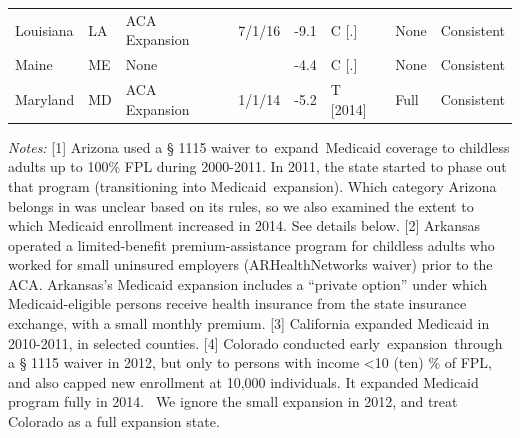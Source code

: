 \documentclass[12pt]{article}%
\begin{document}
\begin{appendices}
\begin{table}[]
\begin{adjustbox}{width=.99\textwidth}
\begin{tabular}{@{}llllllll@{}}
Louisiana                                    & LA                          & ACA Expansion                                                                                               & 7/1/16                   & -9.1                                                                                     & C {[}.{]}                     & None                         & Consistent                                                                                 \\ \addlinespace
Maine                                        & ME                          & None                                                                                                        &                          & -4.4                                                                                       & C {[}.{]}                     & None                         & Consistent                                                                                 \\ \addlinespace
Maryland                                     & MD                          & ACA Expansion                                                                                               & 1/1/14                   & -5.2                                                                                     & T {[}2014{]}                  & Full                         & Consistent                                                                                 \\ \bottomrule
\end{tabular}
\end{adjustbox}
\begin{scriptsize}
 \begin{justify}
   \textit{Notes:} [1] Arizona used a § 1115 waiver to expand Medicaid coverage to childless adults up to 100\% FPL during 2000-2011. In 2011, the state started to phase out that program (transitioning into Medicaid expansion).  Which category Arizona belongs in was unclear based on its rules, so we also examined the extent to which Medicaid enrollment increased in 2014.  See details below.
[2] Arkansas operated a limited-benefit premium-assistance program for childless adults who worked for small uninsured employers (ARHealthNetworks waiver) prior to the ACA.  Arkansas’s Medicaid expansion includes a “private option” under which Medicaid-eligible persons receive health insurance from the state insurance exchange, with a small monthly premium.
[3] California expanded Medicaid in 2010-2011, in selected counties.
[4] Colorado conducted early expansion through a § 1115 waiver in 2012, but only to persons with income <10 (ten) \% of FPL, and also capped new enrollment at 10,000 individuals. It expanded Medicaid program fully in 2014.  We ignore the small expansion in 2012, and treat Colorado as a full expansion state.

\end{justify}
\end{scriptsize}
\end{table}
\end{appendices}
\end{document}
